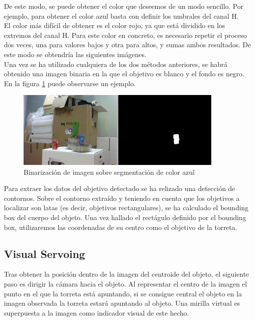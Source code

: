 De este modo, se puede obtener el color que deseemos de un modo sencillo. Por ejemplo, para obtener el color azul basta con definir los umbrales del canal H.\\

El color más difícil de obtener es el color rojo, ya que está dividido en los extremos del canal H. Para este color en concreto, es necesario repetir el proceso dos veces, una para valores bajos y otra para altos, y sumas ambos resultados. De este modo se obtendría las siguientes imágenes.\\

Una vez se ha utilizado cualquiera de los dos métodos anteriores, se habrá obtenido una imagen binaria en la que el objetivo es blanco y el fondo es negro. En la figura \ref{binaria} puede observarse un ejemplo.\\

\begin{figure}[h]
\centering
\includegraphics[width=0.9\textwidth]{images/binaria}%
\caption{Binarización de imagen sobre segmentación de color azul}
\label{binaria}
\end{figure}
\FloatBarrier

Para extraer los datos del objetivo detectado se ha relizado una detección de contornos. Sobre el contorno extraído y teniendo en cuenta que los objetivos a localizar son latas (es decir, objetivos rectangulares), se ha calculado el bounding box del cuerpo del objeto. Una vez hallado el rectágulo definido por el bounding box, utilizaremos las coordenadas de su centro como el objetivo de la torreta.

\subsection{Visual Servoing}
Tras obtener la posición dentro de la imagen del centroide del objeto, el siguiente paso es dirigir la cámara hacia el objeto. Al representar el centro de la imagen el punto en el que la torreta está apuntando, si se consigue central el objeto en la imagen observada la torreta estará apuntando al objeto. Una mirilla virtual es superpuesta a la imagen como indicador visual de este hecho.\\

